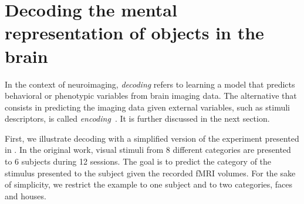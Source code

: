 \documentclass{frontiersSCNS} %
\begin{document}

%




\section{Decoding the mental representation of objects in the brain}

In the context of neuroimaging, \textit{decoding} refers to learning a model
that predicts behavioral or phenotypic variables from brain imaging data. 
The alternative that consists in predicting the imaging data given external
variables, such as stimuli descriptors, is 
called \textit{encoding}~\citep{naselaris2011}. It is further discussed in the next 
section.

First, we illustrate decoding with a simplified version of the experiment presented in
\cite{haxby2001}. In the original work, visual stimuli from 8 different categories
are presented to 6 subjects during 12 sessions. The goal is to 
predict the category of the stimulus presented to the subject given the
recorded fMRI volumes. For the sake of simplicity, we restrict the example
to one subject and to two categories, faces and houses.
\end{document}
